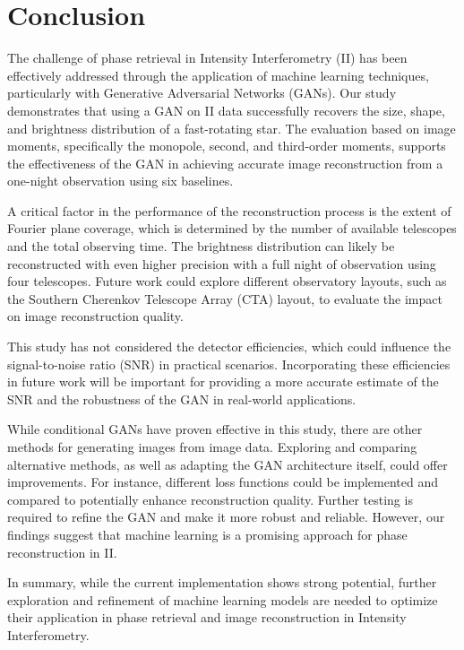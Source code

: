 \section{Conclusion}
The challenge of phase retrieval in Intensity Interferometry (II) has been effectively addressed through the application of machine learning techniques, particularly with Generative Adversarial Networks (GANs). Our study demonstrates that using a GAN on II data successfully recovers the size, shape, and brightness distribution of a fast-rotating star. The evaluation based on image moments, specifically the monopole, second, and third-order moments, supports the effectiveness of the GAN in achieving accurate image reconstruction from a one-night observation using six baselines.

A critical factor in the performance of the reconstruction process is the extent of Fourier plane coverage, which is determined by the number of available telescopes and the total observing time. The brightness distribution can likely be reconstructed with even higher precision with a full night of observation using four telescopes. Future work could explore different observatory layouts, such as the Southern Cherenkov Telescope Array (CTA) layout, to evaluate the impact on image reconstruction quality.

This study has not considered the detector efficiencies, which could influence the signal-to-noise ratio (SNR) in practical scenarios. Incorporating these efficiencies in future work will be important for providing a more accurate estimate of the SNR and the robustness of the GAN in real-world applications.

While conditional GANs have proven effective in this study, there are other methods for generating images from image data. Exploring and comparing alternative methods, as well as adapting the GAN architecture itself, could offer improvements. For instance, different loss functions could be implemented and compared to potentially enhance reconstruction quality. Further testing is required to refine the GAN and make it more robust and reliable. However, our findings suggest that machine learning is a promising approach for phase reconstruction in II.

In summary, while the current implementation shows strong potential, further exploration and refinement of machine learning models are needed to optimize their application in phase retrieval and image reconstruction in Intensity Interferometry.